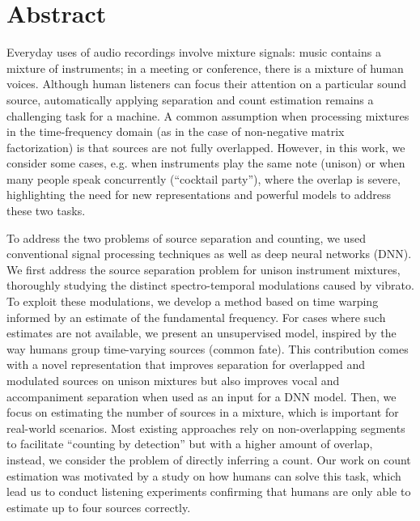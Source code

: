 \begingroup
\let\clearpage\relax
\let\cleardoublepage\relax
\let\cleardoublepage\relax

\chapter*{Abstract}
Everyday uses of audio recordings involve mixture signals: music contains a mixture of instruments; in a meeting or conference, there is a mixture of human voices.
Although human listeners can focus their attention on a particular sound source, automatically applying separation and count estimation remains a challenging task for a machine.
A common assumption when processing mixtures in the time-frequency domain (as in the case of non-negative matrix factorization) is that sources are not fully overlapped.
However, in this work, we consider some cases, e.g. when instruments play the same note (unison) or when many people speak concurrently (``cocktail party''), where the overlap is severe, highlighting the need for new representations and powerful models to address these two tasks.
\par
To address the two problems of source separation and counting, we used conventional signal processing techniques as well as deep neural networks (DNN).
We first address the source separation problem for unison instrument mixtures, thoroughly studying the distinct spectro-temporal modulations caused by vibrato.
To exploit these modulations, we develop a method based on time warping informed by an estimate of the fundamental frequency.
For cases where such estimates are not available, we present an unsupervised model, inspired by the way humans group time-varying sources (common fate).
This contribution comes with a novel representation that improves separation for overlapped and modulated sources on unison mixtures but also improves vocal and accompaniment separation when used as an input for a DNN model.
Then, we focus on estimating the number of sources in a mixture, which is important for real-world scenarios.
Most existing approaches rely on non-overlapping segments to facilitate ``counting by detection'' but with a higher amount of overlap, instead, we consider the problem of directly inferring a count.
Our work on count estimation was motivated by a study on how humans can solve this task, which lead us to conduct listening experiments confirming that humans are only able to estimate up to four sources correctly.
